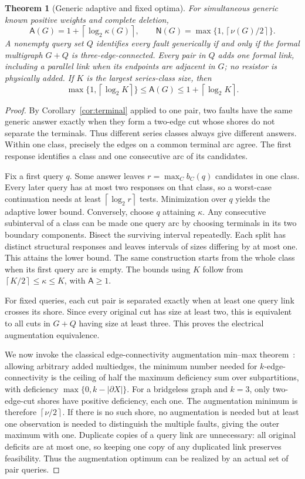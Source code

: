 \documentclass[11pt,letterpaper]{article}
\newtheorem{theorem}{Theorem}
\newcommand{\ceil}[1]{\left\lceil #1\right\rceil}
\newcommand{\A}{\mathsf A}
\newcommand{\N}{\mathsf N}
\begin{document}
\begin{theorem}[Generic adaptive and fixed optima]\label{thm:counts}
For simultaneous generic known positive weights and complete deletion,
\[
 \A(G)=1+\ceil{\log_2\kappa(G)},\qquad
 \N(G)=\max\{1,\ceil{\nu(G)/2}\}.
\]
A nonempty query set $Q$ identifies every fault generically if and only if the formal multigraph $G+Q$ is three-edge-connected. Every pair in $Q$ adds one formal link, including a parallel link when its endpoints are adjacent in $G$; no resistor is physically added. If $K$ is the largest series-class size, then
\[
 \max\{1,\ceil{\log_2 K}\}\le\A(G)\le1+\ceil{\log_2 K}.
\]
\end{theorem}
\begin{proof}
By Corollary~\ref{cor:terminal} applied to one pair, two faults have the same generic answer exactly when they form a two-edge cut whose shores do not separate the terminals. Thus different series classes always give different answers. Within one class, precisely the edges on a common terminal arc agree. The first response identifies a class and one consecutive arc of its candidates.

Fix a first query $q$. Some answer leaves $r=\max_C b_C(q)$ candidates in one class. Every later query has at most two responses on that class, so a worst-case continuation needs at least $\ceil{\log_2 r}$ tests. Minimization over $q$ yields the adaptive lower bound. Conversely, choose $q$ attaining $\kappa$. Any consecutive subinterval of a class can be made one query arc by choosing terminals in its two boundary components. Bisect the surviving interval repeatedly. Each split has distinct structural responses and leaves intervals of sizes differing by at most one. This attains the lower bound. The same construction starts from the whole class when its first query arc is empty. The bounds using $K$ follow from $\ceil{K/2}\le\kappa\le K$, with $\A\ge1$.

For fixed queries, each cut pair is separated exactly when at least one query link crosses its shore. Since every original cut has size at least two, this is equivalent to all cuts in $G+Q$ having size at least three. This proves the electrical augmentation equivalence.

We now invoke the classical edge-connectivity augmentation min--max theorem~\cite{WN,Szigeti}: allowing arbitrary added multiedges, the minimum number needed for $k$-edge-connectivity is the ceiling of half the maximum deficiency sum over subpartitions, with deficiency $\max\{0,k-|\partial X|\}$. For a bridgeless graph and $k=3$, only two-edge-cut shores have positive deficiency, each one. The augmentation minimum is therefore $\ceil{\nu/2}$. If there is no such shore, no augmentation is needed but at least one observation is needed to distinguish the multiple faults, giving the outer maximum with one. Duplicate copies of a query link are unnecessary: all original deficits are at most one, so keeping one copy of any duplicated link preserves feasibility. Thus the augmentation optimum can be realized by an actual set of pair queries.
\end{proof}
\end{document}

